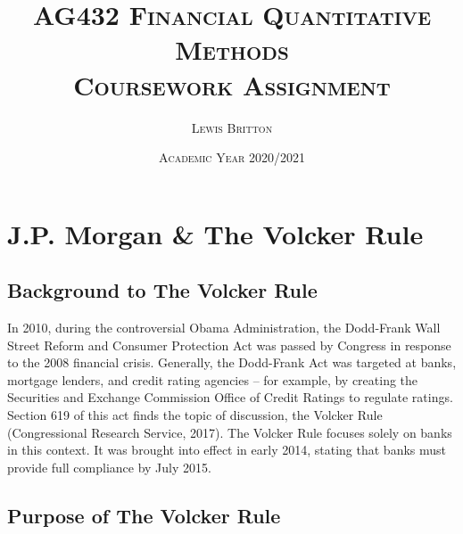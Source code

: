 \documentclass[11pt, english]{article}
\begin{document}

        \title{\textsc{AG432 Financial Quantitative Methods\\ Coursework Assignment}}
        \author{\textsc{Lewis Britton}}
        \date{\textsc{Academic Year 2020/2021}}
        \maketitle

\newpage


        \renewcommand{\contentsname}{Table of Contents}

        \tableofcontents

\newpage


\section{J.P. Morgan \& The Volcker Rule}

	\subsection{Background to The Volcker Rule}

	In 2010, during the controversial Obama Administration, the Dodd-Frank Wall Street Reform and Consumer Protection Act was passed by Congress in response to the 2008 financial crisis. Generally, the Dodd-Frank Act was targeted at banks, mortgage lenders, and credit rating agencies – for example, by creating the Securities and Exchange Commission Office of Credit Ratings to regulate ratings. Section 619 of this act finds the topic of discussion, the Volcker Rule (Congressional Research Service, 2017). The Volcker Rule focuses solely on banks in this context. It was brought into effect in early 2014, stating that banks must provide full compliance by July 2015.

	\subsection{Purpose of The Volcker Rule}
\end{document}
